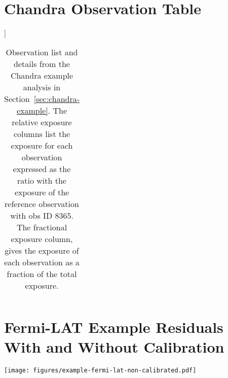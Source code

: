 \documentclass[twocolumn]{aastex631}
\newcommand{\fermi}{\textit{Fermi}-LAT~}
\begin{document}
    \section{Chandra Observation Table}
    \label{sec:chandra-table}
    ]
    \begin{table}
    \centering
        \begin{tabular}{ c|c|c|c|c } 
            
        \end{tabular}
        \label{tab:chandra_obs}
        \caption{Observation list and details from the Chandra example analysis in Section~\ref{sec:chandra-example}. The relative exposure columns list the exposure for each observation expressed as the ratio with the exposure of the reference observation with obs ID 8365. The fractional exposure column, gives the exposure of each observation as a fraction of the total exposure.}
    \end{table}

    \section{Fermi-LAT Example Residuals With and Without Calibration}
     \begin{figure*}
        \begin{centering}
            \texttt{[image: figures/example-fermi-lat-non-calibrated.pdf]}
            \caption{
                Illustration of the residuals of the \fermi analysis example from Section~\ref{sec:fermi-lat-example}. All images show the standardized residuals as computed by Equation~\ref{eq:approx-sigma} and smoothed with a \textit{Gaussian} kernel of width 5~pixels $\approx 0.1$~degrees, similar to the size of the PSF. The upper row shows the result without calibration, the lower row shoes the result with the calibration applied, according to Equation~\ref{eq:model-npred-calibration}. The columns represent the four different PSF event classes of \fermi. More information on this analysis example can be found on \url{https://github.com/jolideco/jolideco-fermi-examples}. 
            }
            \label{fig:example-fermi-lat-non-calibrated}
        \end{centering}
    \end{figure*}
\end{document}
